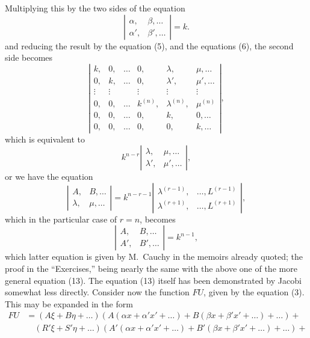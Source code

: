 \documentclass[11pt,a4paper]{article}
\theoremstyle{plain}
\theoremstyle{definition}
\theoremstyle{remark}
\begin{document}
Multiplying this by the two sides of the equation
\[
\left|\begin{array}{cc}
\alpha, & \beta, \ldots \\
\alpha', & \beta', \ldots
\end{array}\right| = k
\tag{10}.
\]
and reducing the result by the equation (5), and the equations (6), the second side
becomes
\[
\left|\begin{array}{cccccc}
k, & 0, & \ldots & 0, & \lambda, & \mu, \ldots \\
0, & k, & \ldots & 0, & \lambda', & \mu', \ldots \\
\vdots & \vdots & & \vdots & \vdots & \vdots \\
0, & 0, & \ldots & k^{(n)}, & \lambda^{(n)}, & \mu^{(n)} \\
0, & 0, & \ldots & 0, & k, & 0, \ldots \\
0, & 0, & \ldots & 0, & 0, & k, \ldots
\end{array}\right|
\tag{11},
\]
which is equivalent to
\[
k^{n-r}\left|\begin{array}{cc}
\lambda, & \mu, \ldots \\
\lambda', & \mu', \ldots
\end{array}\right|
\tag{12},
\]
or we have the equation
\[
\left|\begin{array}{cc}
A, & B, \ldots \\
\lambda, & \mu, \ldots
\end{array}\right| = k^{n-r-1}\left|\begin{array}{cc}
\lambda^{(r-1)}, & \ldots, L^{(r-1)} \\
\lambda^{(r+1)}, & \ldots, L^{(r+1)}
\end{array}\right|
\tag{13},
\]
which in the particular case of $r = n$, becomes
\[
\left|\begin{array}{cc}
A, & B, \ldots \\
A', & B', \ldots
\end{array}\right| = k^{n-1}
\tag{14},
\]
which latter equation is given by M.~Cauchy in the memoirs already quoted; the
proof in the ``Exercises,'' being nearly the same with the above one of the more
general equation (13). The equation (13) itself has been demonstrated by Jacobi
somewhat less directly. Consider now the function $FU$, given by the equation (3).
This may be expanded in the form
\begin{align*}
FU &= (A\xi + B\eta + \ldots)(A(\alpha x + \alpha'x' + \ldots) + B(\beta x + \beta'x' + \ldots) + \ldots) + \tag{15}\\
&\quad (R'\xi + S'\eta + \ldots)(A'(\alpha x + \alpha'x' + \ldots) + B'(\beta x + \beta'x' + \ldots) + \ldots) +
\end{align*}
\end{document}
